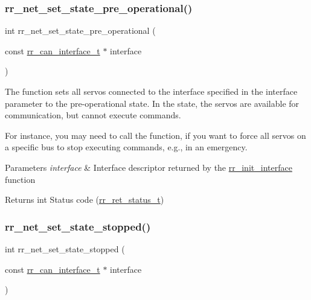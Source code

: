\subsubsection{\texorpdfstring{rr\+\_\+net\+\_\+set\+\_\+state\+\_\+pre\+\_\+operational()}{rr\_net\_set\_state\_pre\_operational()}}
{\footnotesize\ttfamily int rr\+\_\+net\+\_\+set\+\_\+state\+\_\+pre\+\_\+operational (\begin{DoxyParamCaption}\item[{const \hyperlink{structrr__can__interface__t}{rr\+\_\+can\+\_\+interface\+\_\+t} $\ast$}]{interface }\end{DoxyParamCaption})}



The function sets all servos connected to the interface specified in the \textquotesingle{}interface\textquotesingle{} parameter to the pre-\/operational state. In the state, the servos are available for communication, but cannot execute commands. 

For instance, you may need to call the function, if you want to force all servos on a specific bus to stop executing commands, e.\+g., in an emergency.


\begin{DoxyParams}{Parameters}
{\em interface} & Interface descriptor returned by the \hyperlink{group___common_ga472a4890dcc7d7a13123c56a06946d91}{rr\+\_\+init\+\_\+interface} function \\
\hline
\end{DoxyParams}
\begin{DoxyReturn}{Returns}
int Status code (\hyperlink{api_8h_a92d5be5038abcf89837faf85a08debdc}{rr\+\_\+ret\+\_\+status\+\_\+t}) 
\end{DoxyReturn}
\mbox{\label{group___system__control_ga7dd178eafeae0d80edd60e3aee6e13b9}} 
\subsubsection{\texorpdfstring{rr\+\_\+net\+\_\+set\+\_\+state\+\_\+stopped()}{rr\_net\_set\_state\_stopped()}}
{\footnotesize\ttfamily int rr\+\_\+net\+\_\+set\+\_\+state\+\_\+stopped (\begin{DoxyParamCaption}\item[{const \hyperlink{structrr__can__interface__t}{rr\+\_\+can\+\_\+interface\+\_\+t} $\ast$}]{interface }\end{DoxyParamCaption})}



